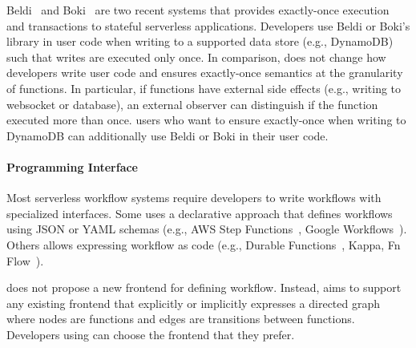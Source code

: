 Beldi~\cite{beldi} and Boki~\cite{boki} are two recent systems that provides
exactly-once execution and transactions to stateful serverless applications.
Developers use Beldi or Boki's library in user code when writing to a
supported data store (e.g., DynamoDB) such that writes are executed only once.
In comparison, \name{} does not change how developers write user code and
ensures exactly-once semantics at the granularity of functions. In particular,
if functions have external side effects (e.g., writing to websocket or
database), an external observer can distinguish if the function executed more
than once. \name{} users who want to ensure exactly-once when writing to
DynamoDB can additionally use Beldi or Boki in their user code.



\paragraph{Programming Interface}

Most serverless workflow systems require developers to write workflows with
specialized interfaces. Some uses a declarative approach that defines
workflows using JSON or YAML schemas (e.g., AWS Step
Functions~\cite{aws-step-functions}, Google
Workflows~\cite{google-workflows}). Others allows expressing workflow as code
(e.g., Durable Functions~\cite{durable-functions}, Kappa\cite{kappa}, Fn
Flow~\cite{fn-flow}).

\name{} does not propose a new frontend for defining workflow. Instead,
\name{} aims to support any existing frontend that explicitly or implicitly
expresses a directed graph where nodes are functions and edges are transitions
between functions. Developers using \name{} can choose the frontend that they
prefer.






